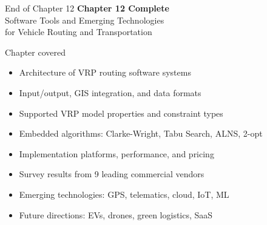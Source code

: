 \documentclass[aspectratio=169,10pt]{beamer}
\begin{document}
\begin{frame}[allowframebreaks]{End of Chapter 12}
  \centering
  \vspace{1.5cm}
  {\Large\bfseries Chapter 12 Complete}\\[1em]
  {\large Software Tools and Emerging Technologies\\
  for Vehicle Routing and Transportation}\\[2em]
  \begin{block}{Chapter covered}
    \begin{itemize}
      \item Architecture of VRP routing software systems
      \item Input/output, GIS integration, and data formats
      \item Supported VRP model properties and constraint types
      \item Embedded algorithms: Clarke-Wright, Tabu Search, ALNS, 2-opt
      \item Implementation platforms, performance, and pricing
      \item Survey results from 9 leading commercial vendors
      \item Emerging technologies: GPS, telematics, cloud, IoT, ML
      \item Future directions: EVs, drones, green logistics, SaaS
    \end{itemize}
  \end{block}
\end{frame}
\end{document}
